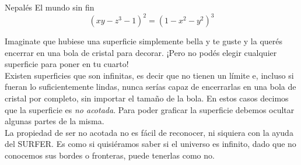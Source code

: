\begin{surferPage}{Nepalés}
El mundo sin fin\\

\smallskip
\[(x y - z^3 -1)^2= (1 - x^2	- y^2)^3\]

\singlespacing
Imaginate que hubiese una superficie simplemente bella y te guste y la querés encerrar en una bola de cristal para decorar. ¡Pero no podés elegir cualquier superficie para poner en tu cuarto!
\\
\singlespacing
Existen superficies que son infinitas, es decir que no tienen un límite e, incluso si fueran lo suficientemente lindas, nunca serías capaz de encerrarlas en una bola de cristal por completo, sin importar el tamaño de la bola. En estos casos decimos que la superficie es \textit{no acotada}. Para poder graficar la superficie debemos ocultar algunas partes de la misma.
\\
\singlespacing
La propiedad de ser no acotada no es fácil de reconocer, ni siquiera con la ayuda del SURFER. Es como si quisiéramos saber si el universo es infinito, dado que no conocemos sus bordes o fronteras, puede tenerlas como no.
\end{surferPage}
